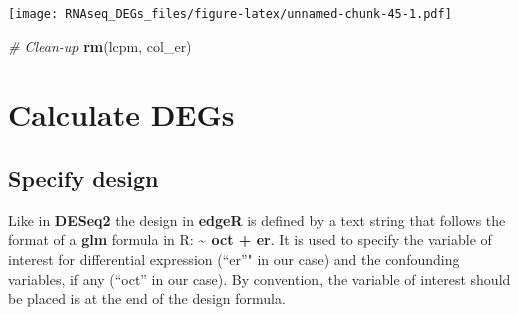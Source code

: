 \documentclass[]{book}
\newenvironment{Shaded}{\begin{snugshade}}{\end{snugshade}}
\newcommand{\KeywordTok}[1]{\textcolor[rgb]{0.13,0.29,0.53}{\textbf{#1}}}
\newcommand{\DataTypeTok}[1]{\textcolor[rgb]{0.13,0.29,0.53}{#1}}
\newcommand{\DecValTok}[1]{\textcolor[rgb]{0.00,0.00,0.81}{#1}}
\newcommand{\StringTok}[1]{\textcolor[rgb]{0.31,0.60,0.02}{#1}}
\newcommand{\CommentTok}[1]{\textcolor[rgb]{0.56,0.35,0.01}{\textit{#1}}}
\newcommand{\OtherTok}[1]{\textcolor[rgb]{0.56,0.35,0.01}{#1}}
\newcommand{\OperatorTok}[1]{\textcolor[rgb]{0.81,0.36,0.00}{\textbf{#1}}}
\newcommand{\NormalTok}[1]{#1}
\begin{document}
\begin{Shaded}
\end{Shaded}

\texttt{[image: RNAseq\_DEGs\_files/figure-latex/unnamed-chunk-45-1.pdf]}

\begin{Shaded}
\begin{Highlighting}[]
\CommentTok{# Clean-up}
\KeywordTok{rm}\NormalTok{(lcpm, col_er)}
\end{Highlighting}
\end{Shaded}

\section{Calculate DEGs}\label{calculate-degs}

\subsection{Specify design}\label{specify-design}

Like in \textbf{DESeq2} the design in \textbf{edgeR} is defined by a
text string that follows the format of a \textbf{glm} formula in R:
\textbf{\textasciitilde{} oct + er}. It is used to specify the variable
of interest for differential expression (``er''" in our case) and the
confounding variables, if any (``oct'' in our case). By convention, the
variable of interest should be placed is at the end of the design
formula.
\end{document}
